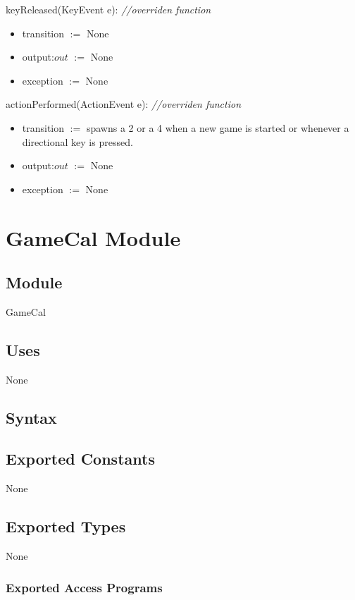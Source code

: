 \documentclass[12pt]{article}
\begin{document}
\noindent keyReleased(KeyEvent e): \textit{//overriden function}

\begin{itemize}
\item transition $:=$ None
  \item output:$out$ $:=$ None
  \item exception $:=$ None
\end{itemize}

\noindent actionPerformed(ActionEvent e): \textit{//overriden function}

\begin{itemize}
\item transition $:=$ spawns a 2 or a 4 when a new game is started or whenever a directional key is pressed. 
  \item output:$out$ $:=$ None
  \item exception $:=$ None
\end{itemize}
\newpage

\section* {GameCal Module}

\subsection* {Module}

GameCal

\subsection*{Uses}

None

\subsection* {Syntax}

\subsection*{Exported Constants}

None

\subsection*{Exported Types}

None

\subsubsection* {Exported Access Programs}
\end{document}
